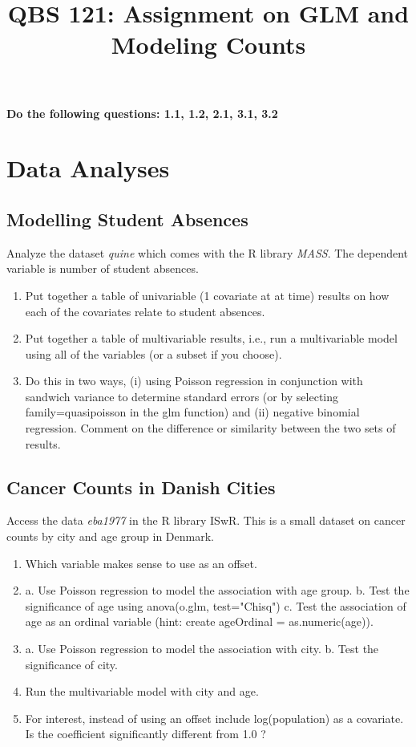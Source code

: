 \documentclass[12pt]{article}
\newenvironment{enum1}
{\begin{enumerate}
  \setlength{\itemsep}{1pt}
  \setlength{\parskip}{0pt}
  \setlength{\parsep}{0pt}
}{\end{enumerate}}
\begin{document}
\title{QBS 121: Assignment on GLM and Modeling Counts}

\maketitle

\pagestyle{headings}

{\bf Do the following questions: 1.1, 1.2, 2.1, 3.1, 3.2}

\section{Data Analyses}

\subsection{Modelling Student Absences}

Analyze the dataset {\it quine} which comes with the R library {\it MASS}. The dependent variable is number of student absences. 
\begin{enum1}
\item Put together a table of univariable (1 covariate at at time) results on how each of the covariates relate to student absences.
\item Put together a table of multivariable results, i.e., run a multivariable model using all of the variables (or a subset if you choose).
\item Do this in two ways, (i) using Poisson regression in conjunction with sandwich variance to determine standard errors (or by selecting family=quasipoisson in the glm function) and (ii) negative binomial regression. Comment on the difference or similarity between the two sets of results.
\end{enum1}

\subsection{Cancer Counts in Danish Cities}

Access the data {\it eba1977} in the R library ISwR. This is a small dataset on cancer counts by city and age group in Denmark.
\begin{enum1}
\item Which variable makes sense to use as an offset.
\item a. Use Poisson regression to model the association with age group. b. Test the significance of age using anova(o.glm, test="Chisq") c. Test the association of age as an ordinal variable (hint: create ageOrdinal = as.numeric(age)).
\item a. Use Poisson regression to model the association with city. b. Test the significance of city. 
\item Run the multivariable model with city and age.
\item For interest, instead of using an offset include log(population) as a covariate. Is the coefficient significantly different from 1.0 ?
\end{enum1}
\end{document}
